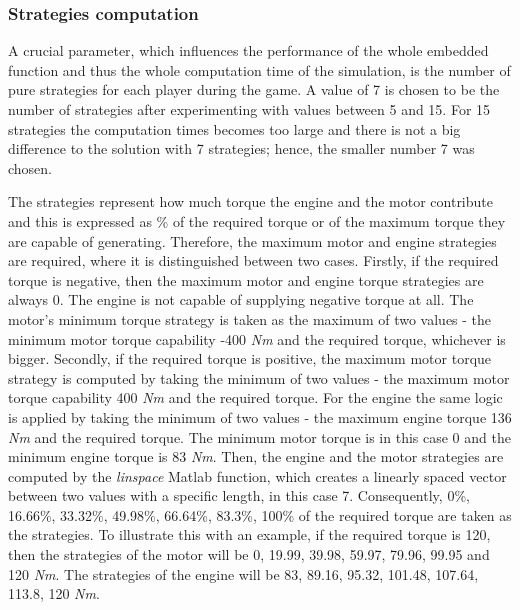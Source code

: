 \subsubsection{Strategies computation}
A crucial parameter, which influences the performance of the whole embedded function and thus the whole computation time of the simulation, is the number of pure strategies for each player during the game. A value of 7 is chosen to be the number of strategies after experimenting with values between 5 and 15. For 15 strategies the computation times becomes too large and there is not a big difference to the solution with 7 strategies; hence, the smaller number 7 was chosen.

The strategies represent how much torque the engine and the motor contribute and this is expressed as \% of the required torque or of the maximum torque they are capable of generating. Therefore, the maximum motor and engine strategies are required, where it is distinguished between two cases. Firstly, if the required torque is negative, then the maximum motor and engine torque strategies are always 0. The engine is not capable of supplying negative torque at all. The motor's minimum torque strategy is taken as the maximum of two values - the minimum motor torque capability -400 \textit{Nm} and the required torque, whichever is bigger. Secondly, if the required torque is positive, the maximum motor torque strategy is computed by taking the minimum of two values - the maximum motor torque capability 400 \textit{Nm} and the required torque. For the engine the same logic is applied by taking the minimum of two values - the maximum engine torque 136 \textit{Nm} and the required torque. The minimum motor torque is in this case 0 and the minimum engine torque is 83 \textit{Nm}. Then, the engine and the motor strategies are computed by the \textit{linspace} Matlab function, which creates a linearly spaced vector between two values with a specific length, in this case 7. Consequently, 0\%, 16.66\%, 33.32\%, 49.98\%, 66.64\%, 83.3\%, 100\% of the required torque are taken as the strategies. To illustrate this with an example, if the required torque is 120, then the strategies of the motor will be 0, 19.99, 39.98, 59.97, 79.96, 99.95 and 120 \textit{Nm}. The strategies of the engine will be 83, 89.16, 95.32, 101.48, 107.64, 113.8, 120 \textit{Nm}. 

